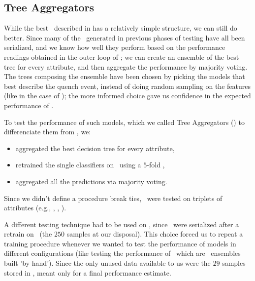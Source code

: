 %

\subsection{Tree Aggregators}
\label{sec:qrp-ta}
While the best \rf\ described in  has a relatively simple structure, we can still
do better. Since many of the \dts\ generated in previous phases of testing have all been serialized, and we
know how well they perform based on the performance readings obtained in the outer loop of \ncv; we
can create an ensemble of the best tree for every attribute, and then aggregate the performance by
majority voting. The trees composing the ensemble have been chosen by picking the models that best
describe the quench event, instead of doing random sampling on the features (like in the case of
\rfs); the more informed choice gave us confidence in the expected performance of \tas.

To test the performance of such models, which we called Tree Aggregators (\tas) to differenciate them from
\rfs, we:
\begin{itemize}
	\item aggregated the best decision tree for every attribute,
	\item retrained the single classifiers on \dr\ using a $5$-fold \cv,
	\item aggregated all the predictions via majority voting.
\end{itemize}
Since we didn't define a procedure break ties, \tas\ were tested on triplets of attributes (e.g., \an, \bn, \cnmod).

A different testing technique had to be used on \tas, since \dts\ were serialized after a retrain on
\dr\ (the $250$ samples at our disposal). This choice forced us to repeat a training procedure
whenever we wanted to test the performance of models in different configurations (like testing the
performance of \tas\ which are \dt\ ensembles built 'by hand'). Since the only unused data available
to us were the $29$ samples stored in \db, meant only for a final performance estimate.

